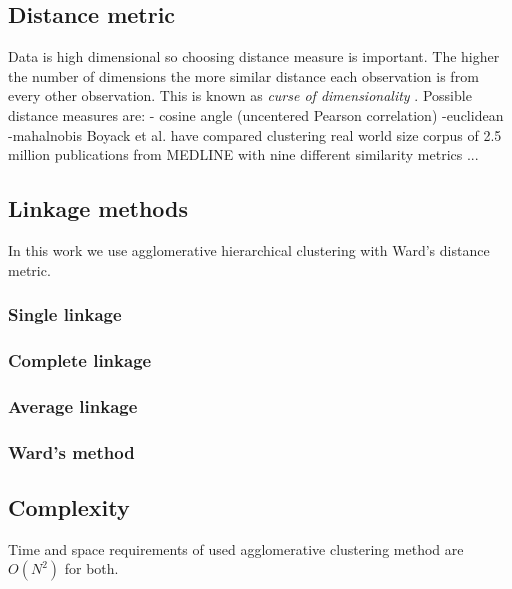 \subsection{Distance metric}
Data is high dimensional so choosing distance measure is 
important. The higher the number of dimensions the more similar 
distance each observation is from every other observation. This is
known as \emph{curse of dimensionality} .
Possible distance measures are:
- cosine angle (uncentered Pearson correlation)
-euclidean
-mahalnobis
Boyack et al. have compared clustering 
real world size corpus of 2.5 million publications from MEDLINE
with nine different similarity metrics \cite{boyack_clustering_2011}...

\subsection{Linkage methods}
In this work we use agglomerative hierarchical clustering with 
Ward's distance metric.

\subsubsection{Single linkage}
\subsubsection{Complete linkage}
\subsubsection{Average linkage}
\subsubsection{Ward's method}

\subsection{Complexity}
Time and space requirements of used agglomerative clustering method
are $O(N^2)$ for both.


